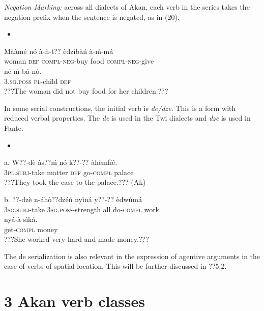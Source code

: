 \documentclass[output=paper]{langsci/langscibook}
\begin{document}
\begin{styleListei}
\emph{Negation Marking:} across all dialects of Akan, each verb in the series takes the negation prefix when the sentence is negated, as in (20). 
\end{styleListei}

\begin{itemize}
\item \end{itemize}
\gll M\`{a}\`{a}m\'{e}  n\'{o}  \`{a}-\`{n}-t??      \`{e}dz\`{i}b\`{a}\'{n}  \`{a}-\`{m}-m\'{a}  \\
     woman  \textsc{def}  \textsc{compl}{}-\textsc{neg}{}-buy  food    \textsc{compl}{}-\textsc{neg}{}-give\\
\gll n\'{e}    \'{m}-b\'{a}    n\'{o}.\\
     \textsc{3.sg.poss}  \textsc{pl}{}-child  \textsc{def}\\
\glt ???The woman did not buy food for her children.???
\z

In some serial constructions, the initial verb is \emph{de/dze}. This is a form with reduced verbal properties. The \emph{de }is used in the Twi dialects and \emph{dze} is used in Fante. 

\begin{itemize}
\item \end{itemize}
\gll a.  W??-d\`{e}    \`{a}s??\'{m}  n\'{o}  k??-??    \`{a}h\`{e}mf\'{i}\'{e}.\\
       \textsc{3pl.subj}{}-take  matter  \textsc{def}  go-\textsc{compl}  palace\\
\glt   ???They took the case to the palace.??? (Ak)
\z

\gll  b.  ??{}-dz\`{e}    n-\'{a}h\`{o}??dz\'{e}\'{n}    ny\`{i}n\'{a}  y??-??     \`{e}dw\'{u}m\'{a} \\
       \textsc{3sg.subj}{}-take  \textsc{3sg.poss}{}-strength  all  do-\textsc{compl}  work\\
\gll   ny\'{a}-\`{a}    s\`{i}k\'{a}.\\
       get-\textsc{compl}  money\\
\glt   ???She worked very hard and made money.???
\z

The de serialization is also relevant in the expression of agentive arguments in the case of verbs of spatial location. This will be further discussed in ??5.2.

\chapter[3  Akan verb classes]{3  Akan verb classes}
\end{document}
